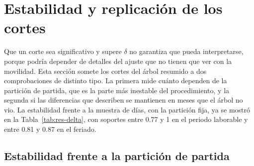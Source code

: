 \section{Estabilidad y replicación de los cortes}\label{sec:res-estabilidad}

Que un corte sea significativo y supere $\delta$ no garantiza que pueda
interpretarse, porque podría depender de detalles del ajuste que no tienen que ver
con la movilidad. Esta sección somete los cortes del árbol resumido a dos
comprobaciones de distinto tipo. La primera mide cuánto dependen de la partición
de partida, que es la parte más inestable del procedimiento, y la segunda si las
diferencias que describen se mantienen en meses que el árbol no vio. La
estabilidad frente a la muestra de días, con la partición fija, ya se mostró en la
Tabla~\ref{tab:res-delta}, con soportes entre 0.77 y 1 en el periodo laborable y
entre 0.81 y 0.87 en el feriado.

\subsection{Estabilidad frente a la partición de partida}

